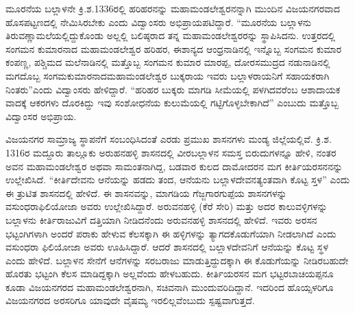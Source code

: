 ಮೂರನೆಯ ಬಲ್ಲಾಳನೇ ಕ್ರಿ.ಶ.1336ರಲ್ಲಿ ಹರಿಹರನನ್ನು ಮಹಾಮಂಡಲೇಶ್ವರನನ್ನಾಗಿ ಮುಂದಿನ ವಿಜಯನಗರವಾದ ಹೊಸಪಟ್ಟಣದಲ್ಲಿ ನೇಮಿಸಿರಬೇಕು ಎಂದು ವಿದ್ವಾಂಸರು ಅಭಿಪ್ರಾಯಪಟಿದ್ದಾರೆ. “ಮೂರನೆಯ ಬಲ್ಲಾಳನು ತಿರುವಣ್ಣಾಮಲೆ\-ಯಲ್ಲಿದ್ದುಕೊಂಡು ಅಲ್ಲಲ್ಲಿ ಬಲಿಷ್ಠರಾದ ತನ್ನ ಮಹಾಮಂಡಲೇಶ್ವರರನ್ನು ಸ್ಥಾಪಿಸಿದನು. ಉತ್ತರದಲ್ಲಿ ಸಂಗಮನ ಕುಮಾರನಾದ ಮಹಾಮಂಡಲೇಶ್ವರ ಹರಿಹರ, ಈಶಾನ್ಯದ ಆಂಧ್ರನಾಡಿನಲ್ಲಿ ಇನ್ನೊಬ್ಬ ಸಂಗಮನ ಕುಮಾರ ಕಂಪಣ್ಣ, ಪಶ್ಚಿಮದ ಮಲೆನಾಡಿನಲ್ಲಿ ಮತ್ತೊಬ್ಬ ಸಂಗಮನ ಕುಮಾರ ಮಾರಪ್ಪ, ದೋರಸಮುದ್ರದ ನಡುನಾಡಿನಲ್ಲಿ ಮಗದೊಬ್ಬ ಸಂಗಮಕುಮಾರನಾದ\break ಮಹಾಮಂಡಲೇಶ್ವರ ಬುಕ್ಕರಾಯ ಇವರು ಬಲ್ಲಾಳರಾಯನಿಗೆ ಸಹಾಯಕರಾಗಿ ನಿಂತರು”ಎಂದು ವಿದ್ವಾಂಸರು ಹೇಳಿದ್ದಾರೆ. “ಹರಿಹರ ಬುಕ್ಕರು ಮಾಗಡಿ ಸೀಮೆಯಲ್ಲಿ ಪಳಗಿದವರೆಂಬ ಆಶಾದಾಯಕ ವಾದಕ್ಕೆ ಆಕರಗಳು ದೊರಕಿದ್ದು ಇವು ಸಂಶೋಧನೆಯ ಕುಲುಮೆಯಲ್ಲಿ ಗಟ್ಟಿಗೊಳ್ಳಬೇಕಾಗಿದೆ” ಎಂಬುದು ಮತ್ತೊಬ್ಬ ವಿದ್ವಾಂಸರ ಅಭಿಪ್ರಾಯ.

ವಿಜಯನಗರ ಸಾಮ್ರಾಜ್ಯ ಸ್ಥಾಪನೆಗೆ ಸಂಬಂಧಿಸಿದಂತೆ ಎರಡು ಪ್ರಮುಖ ಶಾಸನಗಳು ಮಂಡ್ಯ ಜಿಲ್ಲೆಯಲ್ಲಿವೆ. ಕ್ರಿ.ಶ. 1316ರ ಮದ್ದೂರು ತಾಲ್ಲೂಕು ಅರುಹನಹಳ್ಳಿ ಶಾಸನದಲ್ಲಿ ವೀರಬಲ್ಲಾಳನ ಸಮಸ್ತ ಬಿರುದುಗಳನ್ನೂ ಹೇಳಿ, ನಂತರ ಅವನ ಮಹಾಮಂಡಲೇಶ್ವರ ಅಥವಾ ಸಾಮಂತನಾಗಿದ್ದ, ಬಡವಾರ ಕುಲದ ದಾಮೋದರನ ಮಗ ಕೀರ್ತಿಯರಸನನನ್ನು ಉಲ್ಲೇಖಿಸಿದೆ. “ಕೀರ್ತಿದೇವನು ಆನೆಯನ್ನು ಹಡದು ತಂದ, ಆನೆಯನು ಬಲ್ಲಾಳದೇವನತ್ಯಂತವಾಗಿ ಕೊಟ್ಟ ಸ್ತಳ” ಎಂದು ಈ ತ್ರುಟಿತ ಶಾಸನದಲ್ಲಿ ಹೇಳಿದೆ. ಈ ಶಾಸನವನ್ನು, ಮಾಗಡಿಯ ಗೆಜ್ಜಗಾರಗುಪ್ಪೆಯ ಶಾಸನಗಳನ್ನು ವಸುಂಧರಾಫಿಲಿಯೋಜಾ ಅವರು ಉಲ್ಲೇಖಿಸಿದ್ದಾರೆ. ಅರುವನಹಳ್ಳಿ (ಕೆರೆ ಸೇರಿ) ಮತ್ತು ಅದರ ಕಾಲುವಳ್ಳಿಗಳನ್ನು ಬಲ್ಲಾಳನು ಕೀರ್ತಿರಾಜುವಿಗೆ ದತ್ತಿಯಾಗಿ ನೀಡಿದನೆಂದು ಅರುವನಹಳ್ಳಿ ಶಾಸನದಲ್ಲಿ ಹೇಳಿದೆ. ಇವರು ಅರಸನ ಭಟ್ಟಂಗಿಗಳಾಗಿ ಅಂದರೆ ಪರಾಕು ಹೇಳುವ ಕೆಲಸಕ್ಕಾಗಿ ಈ ಹಳ್ಳಿಗಳನ್ನು ತ್ಯಾಗದಕೊಡುಗೆಯಾಗಿ ನೀಡಲಾಗಿದೆ ಎಂದು ವಸುಂಧರಾ ಫಿಲಿಯೋಜಾ ಅವರು ಊಹಿಸಿದ್ದಾರೆ. ಆದರೆ ಶಾಸನದಲ್ಲಿ ಬಲ್ಲಾಳದೇವನಿಗೆ ಆನೆಯನ್ನು ಕೊಟ್ಟ ಸ್ಥಳ ಎಂದು ಹೇಳಿದೆ. ಬಲ್ಲಾಳನ ಸೇನೆಗೆ ಆನೆಗಳನ್ನು ಸರಬರಾಜು ಮಾಡುತ್ತಿದ್ದುದಕ್ಕಾಗಿ ಈ ಕೊಡುಗೆಯನ್ನು ನೀಡಿರಬಹುದೇ ಹೊರತು ಭಟ್ಟಂಗಿ ಕೆಲಸ ಮಾಡಿದ್ದಕ್ಕಾಗಿ ಅಲ್ಲವೆಂದು ಹೇಳಬಹುದು. ಕೀರ್ತಿಯರಸನ ಮಗ ಭಟ್ಟರಬಾಚಿಯಪ್ಪನೂ ಕೂಡಾ ವಿಜಯನಗರದ ಮಹಾಮಂಡಲೇಶ್ವರನಾಗಿ, ಸಚಿವನಾಗಿ ಮುಂದುವರಿದಿದ್ದಾನೆ. ಇದರಿಂದ ಹೊಯ್ಸಳರಿಗೂ ವಿಜಯನಗರದ ಅರಸರಿಗೂ ಯಾವುದೇ ವೈಷಮ್ಯ ಇರಲಿಲ್ಲವೆಂಬುದು ಸ್ಪಷ್ಟವಾಗುತ್ತದೆ. 

